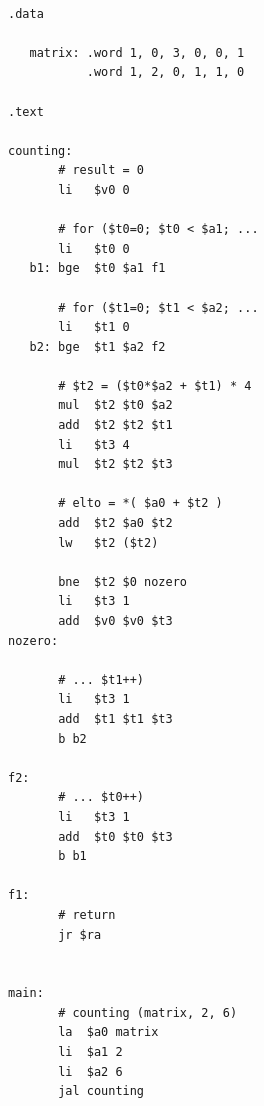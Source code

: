 \begin{lstlisting}

.data

   matrix: .word 1, 0, 3, 0, 0, 1
           .word 1, 2, 0, 1, 1, 0

.text

counting:
       # result = 0
       li   $v0 0

       # for ($t0=0; $t0 < $a1; ...
       li   $t0 0
   b1: bge  $t0 $a1 f1

       # for ($t1=0; $t1 < $a2; ...
       li   $t1 0
   b2: bge  $t1 $a2 f2

       # $t2 = ($t0*$a2 + $t1) * 4
       mul  $t2 $t0 $a2
       add  $t2 $t2 $t1
       li   $t3 4
       mul  $t2 $t2 $t3

       # elto = *( $a0 + $t2 ) 
       add  $t2 $a0 $t2
       lw   $t2 ($t2)

       bne  $t2 $0 nozero
       li   $t3 1
       add  $v0 $v0 $t3
nozero: 

       # ... $t1++) 
       li   $t3 1
       add  $t1 $t1 $t3
       b b2

f2:
       # ... $t0++) 
       li   $t3 1
       add  $t0 $t0 $t3
       b b1

f1:
       # return
       jr $ra


main: 
       # counting (matrix, 2, 6)
       la  $a0 matrix
       li  $a1 2
       li  $a2 6
       jal counting


\end{lstlisting}